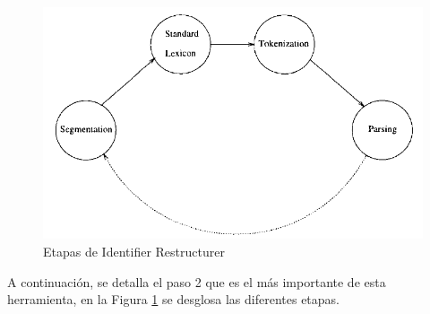 \begin{figure}[t!] %
\centering
\includegraphics[scale= 0.60]{./cap3/ire_2.png}
\caption{Etapas de Identifier Restructurer}
\label{ire2}
\end{figure}

A continuación, se detalla el paso 2 que es el más importante de esta herramienta, en la Figura \ref{ire2} se desglosa las diferentes etapas.

